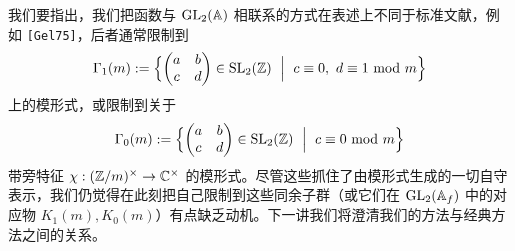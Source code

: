 我们要指出，我们把函数与 $\operatorname{GL}_2(\mathbb{A})$ 相联系的方式在表述上不同于标准文献，例如 \texttt{[Gel75]}，后者通常限制到
\[
\Gamma_1(m):=\Bigl\{\begin{pmatrix}a&b\\c&d\end{pmatrix}\in\SL_2(\Z)\ \Bigm|\ c\equiv0,\ d\equiv1\ \mathrm{mod}\ m\Bigr\}
\]
上的模形式，或限制到关于
\[
\Gamma_0(m):=\Bigl\{\begin{pmatrix}a&b\\c&d\end{pmatrix}\in\SL_2(\Z)\ \Bigm|\ c\equiv0\ \mathrm{mod}\ m\Bigr\}
\]
带旁特征 $\chi:(\mathbb{Z}/m)^\times\to\mathbb{C}^\times$ 的模形式。尽管这些抓住了由模形式生成的一切自守表示，我们仍觉得在此刻把自己限制到这些同余子群（或它们在 $\operatorname{GL}_2(\mathbb{A}_f)$ 中的对应物 $K_1(m),K_0(m)$）有点缺乏动机。下一讲我们将澄清我们的方法与经典方法之间的关系。
